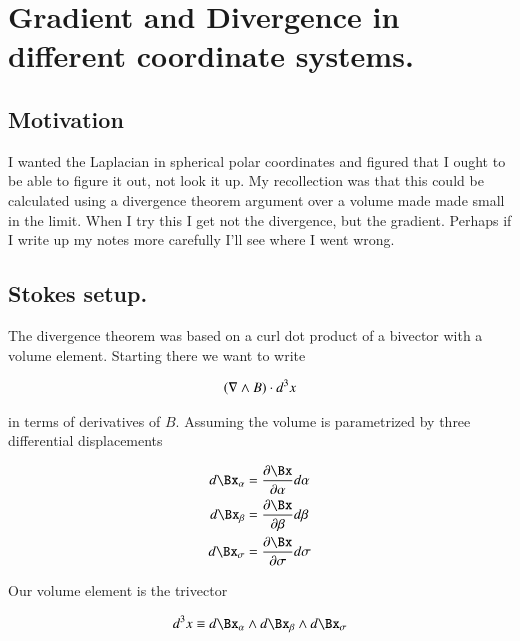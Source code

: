%

\chapter{Gradient and Divergence in different coordinate systems.}
\label{chap:gradientAltCoord}
{}
\date{Aug 22, 2009}

\beginArtWithToc

\section{Motivation}

I wanted the Laplacian in spherical polar coordinates and figured that I ought to be able to figure it out, not look it up.  My recollection was that this could be calculated using a divergence theorem argument over a volume made made small in the limit.  When I try this I get not the divergence, but the gradient.  Perhaps if I write up my notes more carefully I'll see where I went wrong.

\section{Stokes setup.}

The  divergence theorem was based on a curl dot product of a bivector with a volume element.  Starting there we want to write

\begin{align}\label{eqn:curlDotVolumeDifferentialElement}
(\nabla \wedge B) \cdot d^3 x
\end{align}

in terms of derivatives of $B$.  Assuming the volume is parametrized by three differential displacements

\begin{align*}
d\Bx_\alpha &= \PD{\alpha}{\Bx} d\alpha \\
d\Bx_\beta &= \PD{\beta}{\Bx} d\beta \\
d\Bx_\sigma &= \PD{\sigma}{\Bx} d\sigma
\end{align*}

Our volume element is the trivector

\begin{align}\label{eqn:volumeElement}
d^3 x \equiv d\Bx_\alpha  \wedge d\Bx_\beta  \wedge d\Bx_\sigma
\end{align}

